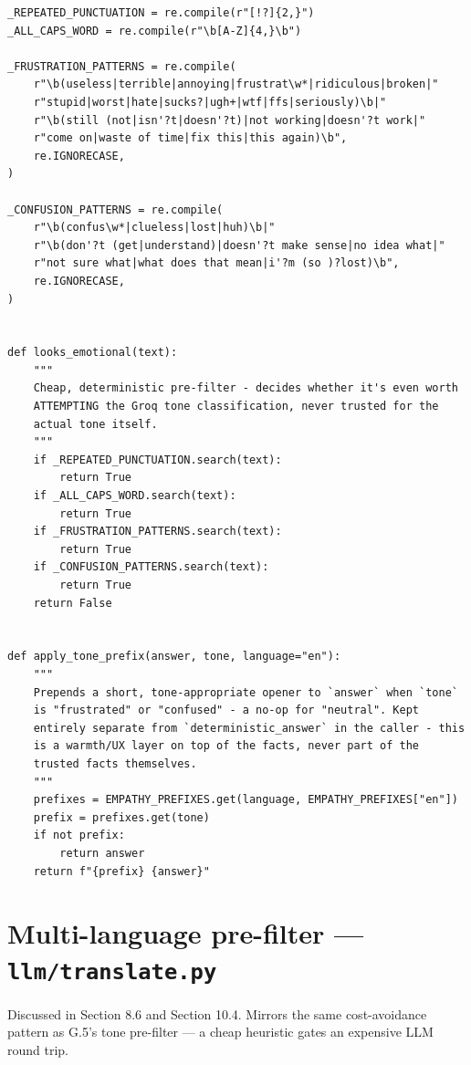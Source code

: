 \begin{lstlisting}[caption={llm/tone.py — the pre-filter and the deterministic prefix}]
_REPEATED_PUNCTUATION = re.compile(r"[!?]{2,}")
_ALL_CAPS_WORD = re.compile(r"\b[A-Z]{4,}\b")

_FRUSTRATION_PATTERNS = re.compile(
    r"\b(useless|terrible|annoying|frustrat\w*|ridiculous|broken|"
    r"stupid|worst|hate|sucks?|ugh+|wtf|ffs|seriously)\b|"
    r"\b(still (not|isn'?t|doesn'?t)|not working|doesn'?t work|"
    r"come on|waste of time|fix this|this again)\b",
    re.IGNORECASE,
)

_CONFUSION_PATTERNS = re.compile(
    r"\b(confus\w*|clueless|lost|huh)\b|"
    r"\b(don'?t (get|understand)|doesn'?t make sense|no idea what|"
    r"not sure what|what does that mean|i'?m (so )?lost)\b",
    re.IGNORECASE,
)


def looks_emotional(text):
    """
    Cheap, deterministic pre-filter - decides whether it's even worth
    ATTEMPTING the Groq tone classification, never trusted for the
    actual tone itself.
    """
    if _REPEATED_PUNCTUATION.search(text):
        return True
    if _ALL_CAPS_WORD.search(text):
        return True
    if _FRUSTRATION_PATTERNS.search(text):
        return True
    if _CONFUSION_PATTERNS.search(text):
        return True
    return False


def apply_tone_prefix(answer, tone, language="en"):
    """
    Prepends a short, tone-appropriate opener to `answer` when `tone`
    is "frustrated" or "confused" - a no-op for "neutral". Kept
    entirely separate from `deterministic_answer` in the caller - this
    is a warmth/UX layer on top of the facts, never part of the
    trusted facts themselves.
    """
    prefixes = EMPATHY_PREFIXES.get(language, EMPATHY_PREFIXES["en"])
    prefix = prefixes.get(tone)
    if not prefix:
        return answer
    return f"{prefix} {answer}"
\end{lstlisting}
\section{Multi-language pre-filter — \texttt{llm/\allowbreak{}translate.py}}
Discussed in Section 8.6 and Section 10.4. Mirrors the same cost-avoidance pattern as G.5's tone pre-filter — a cheap heuristic gates an expensive LLM round trip.

